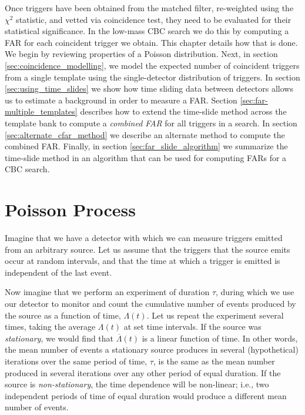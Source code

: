 \def\RP{\ensuremath{\mathcal{R}}}
\def\tR{\ensuremath{\widetilde{\mathcal{R}}}}
\def\far{\ensuremath{\mathcal{F}}}
\def\cfar{\ensuremath{\far_{\mathrm{c}}}}
\def\rsrc{\ensuremath{\widetilde{r}\,}}
\def\Exptd{\ensuremath{\mathbb{E}}}
\def\varH{\ensuremath{\mathrm{H}}}
\def\varL{\ensuremath{\mathrm{L}}}
\def\coincT{\ensuremath{\mathfrak{T}}}
\def\vT{\ensuremath{\mathcal{V}}}
\def\Tf{\ensuremath{\mathrm{T_f}}}
\def\Tb{\ensuremath{\mathrm{T_b}}}


Once triggers have been obtained from the matched filter, re-weighted using the
$\chi^2$ statistic, and vetted via coincidence test, they need to be evaluated
for their statistical significance. In the low-mass CBC search we do this by
computing a \ac{FAR} for each coincident trigger we obtain. This chapter
details how that is done. We begin by reviewing properties of a Poisson
distribution. Next, in section \ref{sec:coincidence_modelling}, we model the
expected number of coincident triggers from a single template using the
single-detector distribution of triggers. In section
\ref{sec:using_time_slides} we show how time sliding data between detectors
allows us to estimate a background in order to measure a \ac{FAR}. Section
\ref{sec:far-multiple_templates} describes how to extend the time-slide method
across the template bank to compute a \emph{combined \ac{FAR}} for all triggers
in a search. In section \ref{sec:alternate_cfar_method} we describe an
alternate method to compute the combined \ac{FAR}. Finally, in section
\ref{sec:far_slide_algorithm} we summarize the time-slide method in an
algorithm that can be used for computing \acp{FAR} for a \ac{CBC} search.

\section{Poisson Process}
\label{sec:poisson}

Imagine that we have a detector with which we can measure triggers emitted from an arbitrary source. Let us assume that the triggers that the source emits occur at random intervals, and that the time at which a trigger is emitted is independent of the last event.

Now imagine that we perform an experiment of duration $\tau$, during which we use our detector to monitor and count the cumulative number of events produced by the source as a function of time, $\Lambda(t)$. Let us repeat the experiment several times, taking the average $\Lambda(t)$ at set time intervals. If the source was \emph{stationary}, we would find that $\overline{\Lambda}(t)$ is a linear function of time. In other words, the mean number of events a stationary source produces in several (hypothetical) iterations over the same period of time, $\tau$, is the same as the mean number produced in several iterations over any other period of equal duration. If the source is \emph{non-stationary}, the time dependence will be non-linear; i.e., two independent periods of time of equal duration would produce a different mean number of events.

